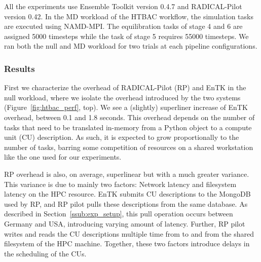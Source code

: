 


All the experiments use Ensemble Toolkit version 0.4.7 and RADICAL-Pilot
version 0.42. In the MD workload of the HTBAC workflow, the simulation tasks
are executed using NAMD-MPI\@. The equilibration %
tasks of stage 4 and 6 are assigned 5000 timesteps while the task of stage 5
requires 55000 timesteps. We ran both the null and MD workload for two trials at each pipeline configurations. 

\subsubsection{Results}\label{ssec:exp_results}

First we characterize the overhead of RADICAL-Pilot (RP) and EnTK in the 
null workload, where we isolate the %
overhead introduced by the two %
systems (Figure~\ref{fig:htbac_perf}, top). We see a (slightly) superliner
increase of EnTK overhead, between 0.1 and 1.8 seconds. This overhead depends
on the number of tasks that need to be translated in-memory from a Python
object to a compute unit (CU) description. As such, it is expected to grow
proportionally to the number of tasks, barring some competition of resources
on a shared workstation like the one used for our experiments.

RP overhead is also, on average, superlinear but with a much greater
variance. This variance is due to mainly two factors: Network latency and
filesystem latency on the HPC resource. EnTK submits CU descriptions to the
MongoDB used by RP, and RP pilot pulls these descriptions from the same
database. As described in Section~\ref{ssub:exp_setup}, this pull operation
occurs between Germany and USA, introducing varying amount of latency.
Further, RP pilot writes and reads the CU descriptions multiple time from to
and from the shared filesystem of the HPC machine. Together, these two
factors introduce delays in the scheduling of the CUs.

